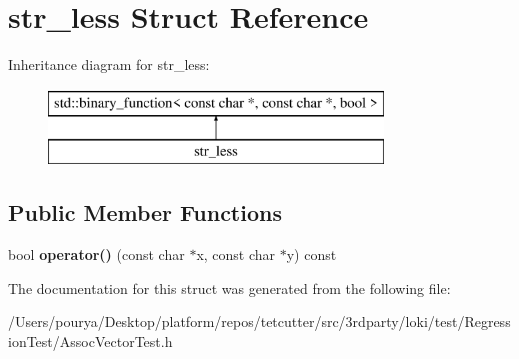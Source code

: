 \hypertarget{structstr__less}{}\section{str\+\_\+less Struct Reference}
\label{structstr__less}
Inheritance diagram for str\+\_\+less\+:\begin{figure}[H]
\begin{center}
\leavevmode
\includegraphics[height=2.000000cm]{structstr__less}
\end{center}
\end{figure}
\subsection*{Public Member Functions}
\begin{DoxyCompactItemize}
\item 
\hypertarget{structstr__less_a43cf2be6122dc69796b1bac2cfadda7f}{}bool {\bfseries operator()} (const char $\ast$x, const char $\ast$y) const \label{structstr__less_a43cf2be6122dc69796b1bac2cfadda7f}

\end{DoxyCompactItemize}


The documentation for this struct was generated from the following file\+:\begin{DoxyCompactItemize}
\item 
/\+Users/pourya/\+Desktop/platform/repos/tetcutter/src/3rdparty/loki/test/\+Regression\+Test/Assoc\+Vector\+Test.\+h\end{DoxyCompactItemize}
